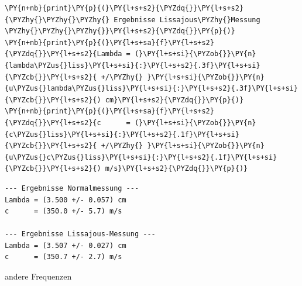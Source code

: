 \begin{tcolorbox}[breakable, size=fbox, boxrule=1pt, pad at break*=1mm,colback=cellbackground, colframe=cellborder]
\begin{Verbatim}[commandchars=\\\{\}]
\PY{n+nb}{print}\PY{p}{(}\PY{l+s+s2}{\PYZdq{}}\PY{l+s+s2}{\PYZhy{}\PYZhy{}\PYZhy{} Ergebnisse Lissajous\PYZhy{}Messung \PYZhy{}\PYZhy{}\PYZhy{}}\PY{l+s+s2}{\PYZdq{}}\PY{p}{)}
\PY{n+nb}{print}\PY{p}{(}\PY{l+s+sa}{f}\PY{l+s+s2}{\PYZdq{}}\PY{l+s+s2}{Lambda = (}\PY{l+s+si}{\PYZob{}}\PY{n}{lambda\PYZus{}liss}\PY{l+s+si}{:}\PY{l+s+s2}{.3f}\PY{l+s+si}{\PYZcb{}}\PY{l+s+s2}{ +/\PYZhy{} }\PY{l+s+si}{\PYZob{}}\PY{n}{u\PYZus{}lambda\PYZus{}liss}\PY{l+s+si}{:}\PY{l+s+s2}{.3f}\PY{l+s+si}{\PYZcb{}}\PY{l+s+s2}{) cm}\PY{l+s+s2}{\PYZdq{}}\PY{p}{)}
\PY{n+nb}{print}\PY{p}{(}\PY{l+s+sa}{f}\PY{l+s+s2}{\PYZdq{}}\PY{l+s+s2}{c      = (}\PY{l+s+si}{\PYZob{}}\PY{n}{c\PYZus{}liss}\PY{l+s+si}{:}\PY{l+s+s2}{.1f}\PY{l+s+si}{\PYZcb{}}\PY{l+s+s2}{ +/\PYZhy{} }\PY{l+s+si}{\PYZob{}}\PY{n}{u\PYZus{}c\PYZus{}liss}\PY{l+s+si}{:}\PY{l+s+s2}{.1f}\PY{l+s+si}{\PYZcb{}}\PY{l+s+s2}{) m/s}\PY{l+s+s2}{\PYZdq{}}\PY{p}{)}
\end{Verbatim}
\end{tcolorbox}

    \begin{Verbatim}[commandchars=\\\{\}]
--- Ergebnisse Normalmessung ---
Lambda = (3.500 +/- 0.057) cm
c      = (350.0 +/- 5.7) m/s

--- Ergebnisse Lissajous-Messung ---
Lambda = (3.507 +/- 0.027) cm
c      = (350.7 +/- 2.7) m/s
    \end{Verbatim}

    andere Frequenzen

